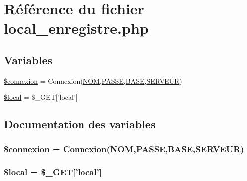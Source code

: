 \hypertarget{local__enregistre_8php}{
\section{R\'{e}f\'{e}rence du fichier local\_\-enregistre.php}
\label{local__enregistre_8php}
}
\subsection*{Variables}
\begin{CompactItemize}
\item 
\hyperlink{local__enregistre_8php_a0}{\$connexion} = Connexion(\hyperlink{pma__connect_8php_a0}{NOM},\hyperlink{pma__connect_8php_a1}{PASSE},\hyperlink{pma__connect_8php_a3}{BASE},\hyperlink{pma__connect_8php_a2}{SERVEUR})
\item 
\hyperlink{local__enregistre_8php_a1}{\$local} = \$\_\-GET\mbox{[}'local'\mbox{]}
\end{CompactItemize}


\subsection{Documentation des variables}
\hypertarget{local__enregistre_8php_a0}{
\subsubsection[\$connexion]{\setlength{\rightskip}{0pt plus 5cm}\$connexion = Connexion(\hyperlink{pma__connect_8php_a0}{NOM},\hyperlink{pma__connect_8php_a1}{PASSE},\hyperlink{pma__connect_8php_a3}{BASE},\hyperlink{pma__connect_8php_a2}{SERVEUR})}}
\label{local__enregistre_8php_a0}


\hypertarget{local__enregistre_8php_a1}{
\subsubsection[\$local]{\setlength{\rightskip}{0pt plus 5cm}\$local = \$\_\-GET\mbox{[}'local'\mbox{]}}}
\label{local__enregistre_8php_a1}


